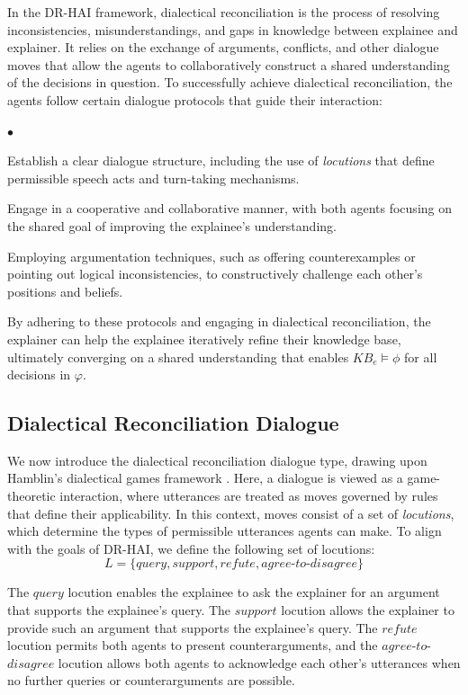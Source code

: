 \documentclass{ecai}
\newcommand{\squishlist}{
\begin{list}{$\bullet$}{ 
    \setlength{\itemsep}{1pt}
    \setlength{\parsep}{0pt}
    \setlength{\topsep}{1.5pt}
    \setlength{\partopsep}{0pt}
    \setlength{\leftmargin}{1em}
    \setlength{\labelwidth}{1em}
    \setlength{\labelsep}{0.5em} } }
\newcommand{\squishend}{\end{list}  }
\begin{document}
In the DR-HAI framework, dialectical reconciliation is the process of resolving inconsistencies, misunderstandings, and gaps in knowledge between explainee and explainer. It relies on the exchange of arguments, conflicts, and other dialogue moves that allow the agents to collaboratively construct a shared understanding of the decisions in question. To successfully achieve dialectical reconciliation, the agents follow certain dialogue protocols that guide their interaction:

\squishlist
\item Establish a clear dialogue structure, including the use of \emph{locutions} that define permissible speech acts and turn-taking mechanisms.
\item Engage in a cooperative and collaborative manner, with both agents focusing on the shared goal of improving the explainee's understanding.
\item Employing argumentation techniques, such as offering counterexamples or pointing out logical inconsistencies, to constructively challenge each other's positions and beliefs.

\squishend

By adhering to these protocols and engaging in dialectical reconciliation, the explainer can help the explainee iteratively refine their knowledge base, ultimately converging on a shared understanding that enables $KB_e \models \phi$ for all decisions in $\varphi$. 

\subsection{Dialectical Reconciliation Dialogue}

We now introduce the dialectical reconciliation dialogue type, drawing upon Hamblin's dialectical games framework \cite{hamblin1970fallacies,hamblin1971mathematical}. Here, a dialogue is viewed as a game-theoretic interaction, where utterances are treated as moves governed by rules that define their applicability. In this context, moves consist of a set of \emph{locutions}, which determine the types of permissible utterances agents can make. To align with the goals of DR-HAI, we define the following set of locutions:
\begin{equation}
L = \{query, support, refute, agree\text{-}to\text{-}disagree \}
\end{equation}

The $query$ locution enables the explainee to ask the explainer for an argument that supports the explainee's query. The $support$ locution allows the explainer to provide such an argument that supports the explainee's query. The $refute$ locution permits both agents to present counterarguments, and the $agree$-$to$-$disagree$ locution allows both agents to acknowledge each other's utterances when no further queries or counterarguments are possible.
\end{document}
